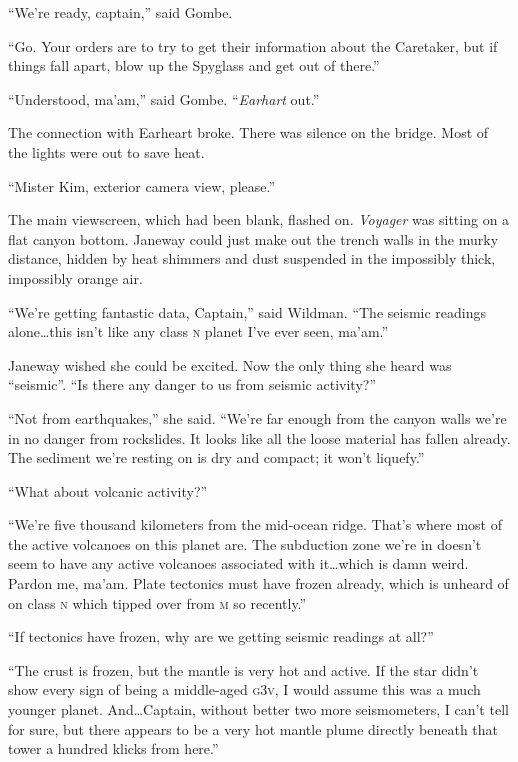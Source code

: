 \documentclass[twoside,letterpaper,12pt]{memoir}
\begin{document}
``We're ready, captain,'' said Gombe.

``Go. Your orders are to try to get their information about the Caretaker, but if things fall apart, blow up the Spyglass and get out of there.''

``Understood, ma'am,'' said Gombe. ``\textit{Earhart} out.''

The connection with Earheart broke. There was silence on the bridge. Most of the lights were out to save heat.

``Mister Kim, exterior camera view, please.''

The main viewscreen, which had been blank, flashed on. \textit{Voyager} was sitting on a flat canyon bottom. Janeway could just make out the trench walls in the murky distance, hidden by heat shimmers and dust suspended in the impossibly thick, impossibly orange air.

``We're getting fantastic data, Captain,'' said Wildman. ``The seismic readings alone\ldots this isn't like any class \textsc{n} planet I've ever seen, ma'am.''

Janeway wished she could be excited. Now the only thing she heard was ``seismic''. ``Is there any danger to us from seismic activity?''

``Not from earthquakes,'' she said. ``We're far enough from the canyon walls we're in no danger from rockslides. It looks like all the loose material has fallen already. The sediment we're resting on is dry and compact; it won't liquefy.''

``What about volcanic activity?''

``We're five thousand kilometers from the mid-ocean ridge. That's where most of the active volcanoes on this planet are. The subduction zone we're in doesn't seem to have any active volcanoes associated with it\ldots which is damn weird. Pardon me, ma'am. Plate tectonics must have frozen already, which is unheard of on class \textsc{n} which tipped over from \textsc{m} so recently.''

``If tectonics have frozen, why are we getting seismic readings at all?''

``The crust is frozen, but the mantle is very hot and active. If the star didn't show every sign of being a middle-aged \textsc{g3v}, I would assume this was a much younger planet. And\ldots Captain, without better two more seismometers, I can't tell for sure, but there appears to be a very hot mantle plume directly beneath that tower a hundred klicks from here.''
\end{document}

